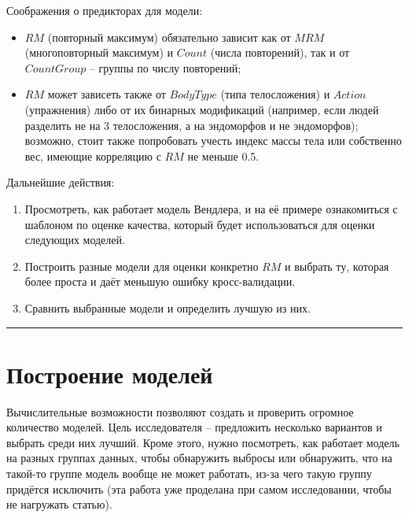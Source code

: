 \documentclass[
]{article}
\begin{document}
Соображения о предикторах для модели:

\begin{itemize}
\item
  \(RM\) (повторный максимум) обязательно зависит как от \(MRM\)
  (многоповторный максимум) и \(Count\) (числа повторений), так и от
  \(CountGroup\) -- группы по числу повторений;
\item
  \(RM\) может зависеть также от \(BodyType\) (типа телосложения) и
  \(Action\) (упражнения) либо от их бинарных модификаций (например,
  если людей разделить не на 3 телосложения, а на эндоморфов и не
  эндоморфов); возможно, стоит также попробовать учесть индекс массы
  тела или собственно вес, имеющие корреляцию с \(RM\) не меньше 0.5.
\end{itemize}

Дальнейшие действия:

\begin{enumerate}
\def\labelenumi{\arabic{enumi}.}
\item
  Просмотреть, как работает модель Вендлера, и на её примере
  ознакомиться с шаблоном по оценке качества, который будет
  использоваться для оценки следующих моделей.
\item
  Построить разные модели для оценки конкретно \(RM\) и выбрать ту,
  которая более проста и даёт меньшую ошибку кросс-валидации.
\item
  Сравнить выбранные модели и определить лучшую из них.
\end{enumerate}

\begin{center}\rule{0.5\linewidth}{0.5pt}\end{center}

\hypertarget{ux43fux43eux441ux442ux440ux43eux435ux43dux438ux435-ux43cux43eux434ux435ux43bux435ux439}{%
\section{Построение
моделей}\label{ux43fux43eux441ux442ux440ux43eux435ux43dux438ux435-ux43cux43eux434ux435ux43bux435ux439}}

Вычислительные возможности позволяют создать и проверить огромное
количество моделей. Цель исследователя -- предложить несколько вариантов
и выбрать среди них лучший. Кроме этого, нужно посмотреть, как работает
модель на разных группах данных, чтобы обнаружить выбросы или
обнаружить, что на такой-то группе модель вообще не может работать,
из-за чего такую группу придётся исключить (эта работа уже проделана при
самом исследовании, чтобы не нагружать статью).
\end{document}
